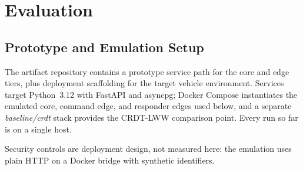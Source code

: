 \section{Evaluation}
\label{sec:implementation}

\subsection{Prototype and Emulation Setup}
\label{sec:eval-env}
\label{sec:validation}
\label{sec:evaluation}

The artifact repository contains a prototype service path for the core and edge tiers,
plus deployment scaffolding for the target vehicle environment. Services target
Python~3.12 with FastAPI and asyncpg; Docker Compose instantiates the emulated core,
command edge, and responder edges used below, and a separate \textit{baseline/crdt}
stack provides the CRDT-LWW comparison point. Every run so far is on a single host.

Security controls are deployment design, not measured here: the emulation uses plain
HTTP on a Docker bridge with synthetic identifiers.
